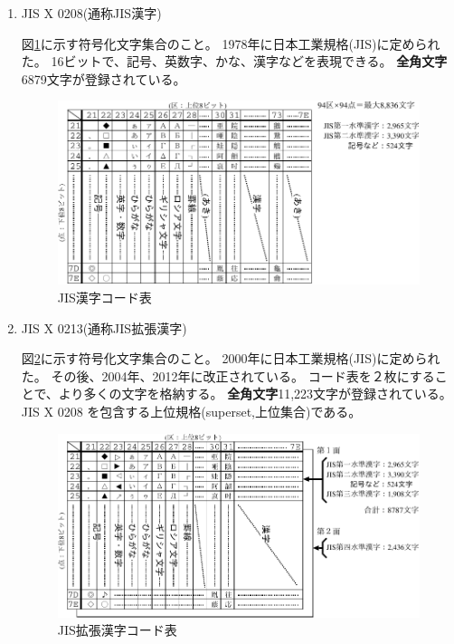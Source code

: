 \documentclass[uplatex]{jsarticle}
\begin{document}
\begin{enumerate}
\begin{enumerate}
\newpage

\item JIS X 0208(通称JIS漢字)

図\ref{fig4}に示す符号化文字集合のこと。
1978年に日本工業規格(JIS)に定められた。
16ビットで、記号、英数字、かな、漢字などを表現できる。
{\bf 全角文字}6879文字が登録されている。

\begin{figure}[hbtp]
\begin{center}
\includegraphics[scale=0.9]{jisx0208.pdf}
\caption{JIS漢字コード表}
\label{fig4}
\end{center}
\end{figure}

\item JIS X 0213(通称JIS拡張漢字)

図\ref{fig5}に示す符号化文字集合のこと。
2000年に日本工業規格(JIS)に定められた。
その後、2004年、2012年に改正されている。
コード表を２枚にすることで、より多くの文字を格納する。
{\bf 全角文字}11,223文字が登録されている。
JIS X 0208 を包含する上位規格(superset,上位集合)である。

\begin{figure}[hbtp]
\begin{center}
\includegraphics[scale=0.9]{jisx0213.pdf}
\caption{JIS拡張漢字コード表}
\label{fig5}
\end{center}
\end{figure}


\end{enumerate}
\end{enumerate}
\end{document}
